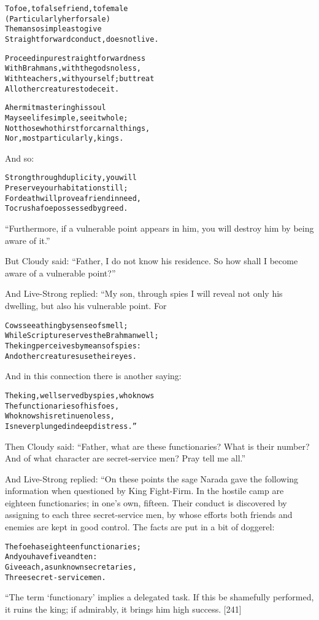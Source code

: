 \documentclass{article}
\renewenvironment{verbatim}{\begin{alltt}\normalfont\begin{centering}}{\end{centering}\end{alltt}}
\begin{document}
\begin{verbatim}
To foe, to false friend, to female
(Particularly her for sale)
The man so simple as to give
Straightforward conduct, does not live.

Proceed in pure straightforwardness
With Brahmans, with the gods no less,
With teachers, with yourself; but treat
All other creatures to deceit.

A hermit mastering his soul
May see life simple, see it whole;
Not those who thirst for carnal things,
Nor, most particularly, kings.
\end{verbatim}
And so:

\begin{verbatim}
Strong through duplicity, you will
Preserve your habitation still;
For death will prove a friend in need,
To crush a foe possessed by greed.
\end{verbatim}
``Furthermore, if a vulnerable point appears in him, you will destroy him by being aware of it.''

But Cloudy said:
``Father, I do not know his residence. So how shall I become aware of a vulnerable point?''

And Live-Strong replied: “My son, through spies I will reveal not
only his dwelling, but also his vulnerable point. For

\begin{verbatim}
Cows see a thing by sense of smell;
While Scripture serves the Brahman well;
The king perceives by means of spies:
And other creatures use their eyes.
\end{verbatim}
And in this connection there is another saying:

\begin{verbatim}
The king, well served by spies, who knows
The functionaries of his foes,
Who knows his retinue no less,
Is never plunged in deep distress.”
\end{verbatim}
Then Cloudy said:
``Father, what are these functionaries? What is their number? And of what character are secret-service men? Pray tell me all.''

And Live-Strong replied: “On these points the sage Narada gave the
following information when questioned by King Fight-Firm. In the
hostile camp are eighteen functionaries; in one's own, fifteen.
Their conduct is discovered by assigning to each three
secret-service men, by whose efforts both friends and enemies are
kept in good control. The facts are put in a bit of doggerel:

\begin{verbatim}
The foe has eighteen functionaries;
    And you have five and ten:
Give each, as unknown secretaries,
    Three secret-service men.
\end{verbatim}
“The term `functionary' implies a delegated task. If this be
shamefully performed, it ruins the king; if admirably, it brings
him high success. [241]
\end{document}
